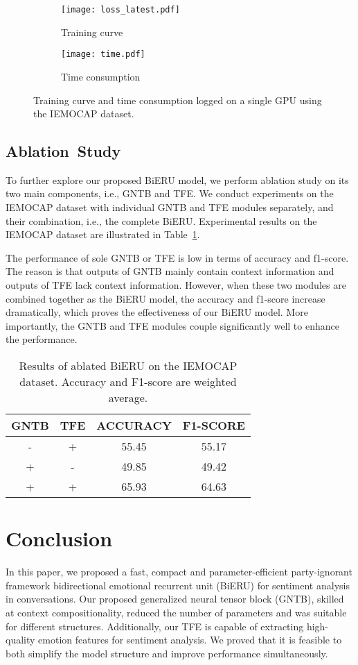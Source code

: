 \documentclass[journal]{IEEEtran}
\begin{document}
\begin{figure}[ht!]
\centering
\begin{subfigure}{0.35\textwidth}
    \texttt{[image: loss\_latest.pdf]}
    \caption{Training curve}
    \label{fig:loss}
\end{subfigure}{}
\begin{subfigure}{0.35\textwidth}
    \texttt{[image: time.pdf]}
    \caption{Time consumption}
    \label{fig:time}
\end{subfigure}
\linespread{1}
\caption{Training curve and time consumption logged on a single GPU using the IEMOCAP dataset.}
\end{figure}{}

\subsection{Ablation~Study}
To further explore our proposed BiERU model, we perform ablation study on its two main components, i.e., GNTB and TFE. We conduct experiments on the IEMOCAP dataset with individual GNTB and TFE modules separately, and their combination, i.e., the complete BiERU. Experimental results on the IEMOCAP dataset are illustrated in Table~\ref{tab:ablation}.

The performance of sole GNTB or TFE is low in terms of accuracy and f1-score. The reason is that outputs of GNTB mainly contain context information and outputs of TFE lack context information. However, when these two modules are combined together as the BiERU model, the accuracy and f1-score increase dramatically, which proves the effectiveness of our BiERU model. More importantly, the GNTB and TFE modules couple significantly well to enhance the performance.
\begin{table}[!h]
\small
    \centering
    \begin{tabular}{|c|c|c|c|}
    \toprule
    GNTB & TFE & ACCURACY & F1-SCORE \\
    \midrule
     - & + & 55.45 &  55.17 \\
     + & - & 49.85 & 49.42\\
     + & + & 65.93 & 64.63 \\
    \bottomrule
    \end{tabular}
    \linespread{1}
    \caption{Results of ablated BiERU on the IEMOCAP dataset. Accuracy and F1-score are weighted average.}
    \label{tab:ablation}
\end{table}{}


\section{Conclusion}
\label{sec:conclusion}
In this paper, we proposed a fast, compact and parameter-efficient party-ignorant framework bidirectional emotional recurrent unit (BiERU) for sentiment analysis in conversations. Our proposed generalized neural tensor block (GNTB), skilled at context compositionality, reduced the number of parameters and was suitable for different structures. Additionally, our TFE is capable of extracting high-quality emotion features for sentiment analysis. We proved that it is feasible to both simplify the model structure and improve performance simultaneously.
\end{document}
